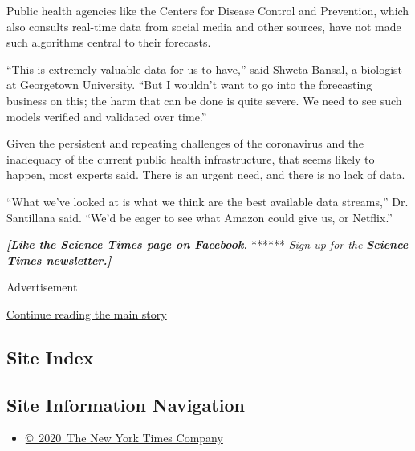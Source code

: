 Public health agencies like the Centers for Disease Control and
Prevention, which also consults real-time data from social media and
other sources, have not made such algorithms central to their forecasts.

``This is extremely valuable data for us to have,'' said Shweta Bansal,
a biologist at Georgetown University. ``But I wouldn't want to go into
the forecasting business on this; the harm that can be done is quite
severe. We need to see such models verified and validated over time.''

Given the persistent and repeating challenges of the coronavirus and the
inadequacy of the current public health infrastructure, that seems
likely to happen, most experts said. There is an urgent need, and there
is no lack of data.

``What we've looked at is what we think are the best available data
streams,'' Dr. Santillana said. ``We'd be eager to see what Amazon could
give us, or Netflix.''

\textbf{\emph{{[}}\href{http://on.fb.me/1paTQ1h}{\emph{Like the Science
Times page on Facebook.}}} ****** \emph{\textbar{} Sign up for the}
\textbf{\href{http://nyti.ms/1MbHaRU}{\emph{Science Times
newsletter.}}\emph{{]}}}

Advertisement

\protect\hyperlink{after-bottom}{Continue reading the main story}

\hypertarget{site-index}{%
\subsection{Site Index}\label{site-index}}

\hypertarget{site-information-navigation}{%
\subsection{Site Information
Navigation}\label{site-information-navigation}}

\begin{itemize}
\tightlist
\item
  \href{https://help.nytimes.com/hc/en-us/articles/115014792127-Copyright-notice}{©~2020~The
  New York Times Company}
\end{itemize}

